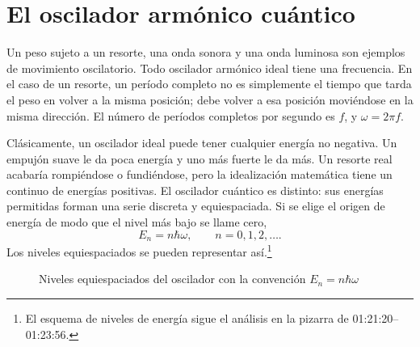 \begin{classroomqa}
\end{classroomqa}

\section{El oscilador armónico cuántico}

Un peso sujeto a un resorte, una onda sonora y una onda luminosa son ejemplos de movimiento oscilatorio. Todo oscilador armónico ideal tiene una frecuencia. En el caso de un resorte, un período completo no es simplemente el tiempo que tarda el peso en volver a la misma posición; debe volver a esa posición moviéndose en la misma dirección. El número de períodos completos por segundo es \(f\), y \(\omega=2\pi f\).

Clásicamente, un oscilador ideal puede tener cualquier energía no negativa. Un empujón suave le da poca energía y uno más fuerte le da más. Un resorte real acabaría rompiéndose o fundiéndose, pero la idealización matemática tiene un continuo de energías positivas. El oscilador cuántico es distinto: sus energías permitidas forman una serie discreta y equiespaciada. Si se elige el origen de energía de modo que el nivel más bajo se llame cero,
\begin{equation}
E_n=n\hbar\omega,
\qquad n=0,1,2,\ldots .
\end{equation}
Los niveles equiespaciados se pueden representar así.\footnote{El esquema de niveles de energía sigue el análisis en la pizarra de 01:21:20--01:23:56.}

\begin{figure}[t]
\centering
{}
\caption{Niveles equiespaciados del oscilador con la convención \(E_n=n\hbar\omega\)}
\end{figure}


